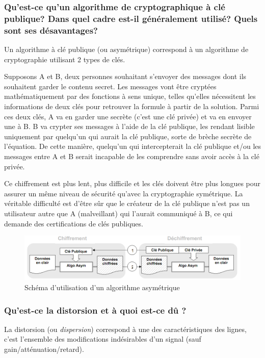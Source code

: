 \subsubsection{Qu'est-ce qu'un algorithme de cryptographique à clé publique?
Dans quel cadre est-il généralement utilisé? Quels sont ses désavantages?}

Un algorithme à clé publique (ou asymétrique) correspond à un algorithme de cryptographie utilisant 2 types de clés.

Supposons A et B, deux personnes souhaitant s'envoyer des messages dont ils souhaitent garder le contenu secret. Les messages vont être cryptées mathématiquement par des fonctions à sens unique, telles qu'elles nécessitent les informations de deux clés pour retrouver la formule à partir de la solution. Parmi ces deux clés, A va en garder une secrète (c'est une clé privée) et va en envoyer une à B. B va crypter ses messages à l'aide de la clé publique, les rendant lisible uniquement par quelqu'un qui aurait la \og{}clé publique\fg{}, sorte de brèche secrète de l'équation. De cette manière, quelqu'un qui intercepterait la clé publique et/ou les messages entre A et B serait incapable de les comprendre sans avoir accès à la clé privée.

Ce chiffrement est plus lent, plus difficile et les clés doivent être plus longues pour assurer un même niveau de sécurité qu'avec la cryptographie symétrique. La véritable difficulté est d'être sûr que le créateur de la clé publique n'est pas un utilisateur autre que A (malveillant) qui l'aurait communiqué à B, ce qui demande des certifications de clés publiques.

\begin{figure}[H]
    \centering
    \includegraphics[width=\linewidth]{img/algorithme_asymetrique.png}
    \caption{Schéma d'utilisation d'un algorithme asymétrique}
\end{figure}

\subsubsection{Qu'est-ce la distorsion et à quoi est-ce dû ?}

La distorsion (ou \textit{dispersion}) correspond à une des caractéristiques des lignes, c'est l'ensemble des modifications indésirables d'un signal (sauf gain/atténuation/retard).

